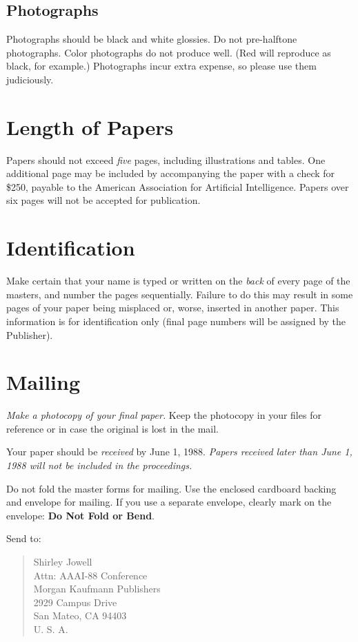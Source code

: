 \subsection{Photographs}

Photographs should be black and white glossies.
Do not pre-halftone photographs.
Color photographs do not produce well.
(Red will reproduce as black, for example.)
Photographs incur extra expense, so
please use them judiciously.

\section{Length of Papers}

Papers should not exceed {\em five\/} pages, including illustrations and
tables.
One additional page may be included by accompanying the paper with a
check for \$250, payable to the American Association for Artificial
Intelligence.
Papers over six pages will not be accepted for publication.

\section{Identification}

Make certain that your name is typed or written on the {\em back\/} of
every page of the masters, and number the pages sequentially.
Failure to do this may result in some pages of your paper being
misplaced or, worse, inserted in another paper.
This information is for identification only (final page numbers will
be assigned by the Publisher).

\section{Mailing}

{\em Make a photocopy of your final paper.}
Keep the photocopy in your files for reference or in case the original
is lost in the mail.

Your paper should be {\em received\/} by June 1, 1988.
{\em Papers received later than June 1, 1988 will not be
included in the proceedings.}

Do not fold the master forms for mailing.
Use the enclosed cardboard backing and envelope for mailing.
If you use a separate envelope, clearly mark on the envelope:
{\bf Do Not Fold or Bend}.

Send to:
\begin{quote}
Shirley Jowell \\
Attn: AAAI-88 Conference \\
Morgan Kaufmann Publishers \\
2929 Campus Drive \\
San Mateo, CA \hspace{1em} 94403\\
U. S. A.
\end{quote}

